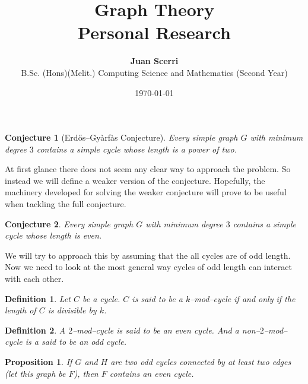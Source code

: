 \documentclass[12pt]{article}
\title{Graph Theory\\
\vspace{0.75em}\textbf{Personal Research}}
\date{\today}
\author {{\textbf{Juan Scerri}}\\
B.Sc. (Hons)(Melit.) Computing Science and Mathematics (Second Year)}
\theoremstyle{plain}
\newtheorem{prop}{Proposition}
\newtheorem{conj}{Conjecture}
\newtheorem{defn}{Definition}
\begin{document}
\maketitle %

\thispagestyle{empty} %

\begin{conj}[Erd\H os–Gy\` arf\` as Conjecture]

Every simple graph $G$ with minimum degree $3$ contains a simple
cycle whose length is a power of two.

\end{conj}

At first glance there does not seem any clear way to approach
the problem. So instead we will define a weaker version of the
conjecture. Hopefully, the machinery developed for solving the
weaker conjecture will prove to be useful when tackling the full
conjecture.

\begin{conj}

Every simple graph $G$ with minimum degree $3$ contains a simple
cycle whose length is even.

\end{conj}

We will try to approach this by assuming that the all cycles are
of odd length. Now we need to look at the most general way
cycles of odd length can interact with each other.

\begin{defn}
Let $C$ be a cycle. $C$ is said to be a $k$--mod--cycle if and
only if the length of $C$ is divisible by $k$.
\end{defn}

\begin{defn}
A $2$--mod--cycle is said to be an even cycle. And a
non--$2$--mod--cycle is a said to be an odd cycle. 
\end{defn}

\begin{prop}
If $G$ and $H$ are two odd cycles connected by at least two
edges (let this graph be $F$), then $F$ contains an even cycle. 
\end{prop}
\end{document}
